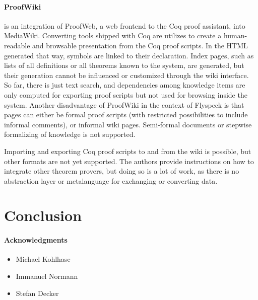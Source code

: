 \documentclass{llncs}
\begin{document}
\paragraph{ProofWiki~\cite{CorKal:CoopReposFormalProofs07}} is an integration of ProofWeb,
a web frontend to the Coq proof assistant, into MediaWiki.  Converting tools shipped with
Coq are utilizes to create a human-readable and browsable presentation from the Coq proof
scripts.  In the HTML generated that way, symbols are linked to their declaration.  Index
pages, such as lists of all definitions or all theorems known to the system, are
generated, but their generation cannot be influenced or customized through the wiki
interface.  So far, there is just text search, and dependencies
among knowledge items are only computed for exporting proof scripts but not used for
browsing inside the system.  Another disadvantage of ProofWiki in the context of Flyspeck
is that pages can either be formal proof scripts (with restricted possibilities to include
informal comments), or informal wiki pages.  Semi-formal documents or stepwise formalizing
of knowledge is not supported.

Importing and exporting Coq proof scripts to and from the wiki is possible, but other
formats are not yet supported.  The authors provide instructions on how to integrate other
theorem provers, but doing so is a lot of work, as there is no abstraction layer or
metalanguage for exchanging or converting data.


\section{Conclusion}
\label{sec:conc}


\paragraph{Acknowledgments}
\label{sec:ack}

\begin{itemize}
\item Michael Kohlhase
\item Immanuel Normann
\item Stefan Decker
\end{itemize}





\ednotemessage
\end{document}
